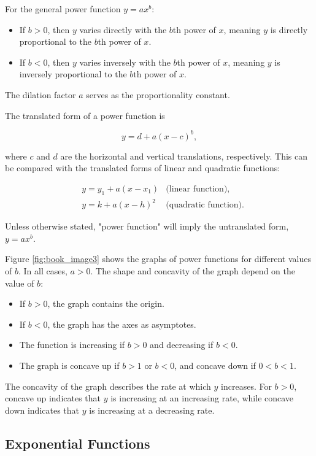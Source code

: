 For the general power function \(y = ax^b\):
\begin{itemize}
    \item If \(b > 0\), then \(y\) varies directly with the \(b\)th power of \(x\), meaning \(y\) is directly proportional to the \(b\)th power of \(x\).
    \item If \(b < 0\), then \(y\) varies inversely with the \(b\)th power of \(x\), meaning \(y\) is inversely proportional to the \(b\)th power of \(x\).
\end{itemize}

The dilation factor \(a\) serves as the proportionality constant.

The translated form of a power function is

\[
y = d + a(x - c)^b,
\]

where \(c\) and \(d\) are the horizontal and vertical translations, respectively. This can be compared with the translated forms of linear and quadratic functions:

\[
\begin{aligned}
& y = y_1 + a(x - x_1) &\text{(linear function)}, \\
& y = k + a(x - h)^2 &\text{(quadratic function)}.
\end{aligned}
\]

Unless otherwise stated, "power function" will imply the untranslated form, \(y = ax^b\).

Figure \ref{fig:book_image3} shows the graphs of power functions for different values of \(b\). In all cases, \(a > 0\). The shape and concavity of the graph depend on the value of \(b\):
\begin{itemize}
    \item If \(b > 0\), the graph contains the origin.
    \item If \(b < 0\), the graph has the axes as asymptotes.
    \item The function is increasing if \(b > 0\) and decreasing if \(b < 0\).
    \item The graph is concave up if \(b > 1\) or \(b < 0\), and concave down if \(0 < b < 1\).
\end{itemize}
The concavity of the graph describes the rate at which \(y\) increases. For \(b > 0\), concave up indicates that \(y\) is increasing at an increasing rate, while concave down indicates that \(y\) is increasing at a decreasing rate.

\subsection*{Exponential Functions}

